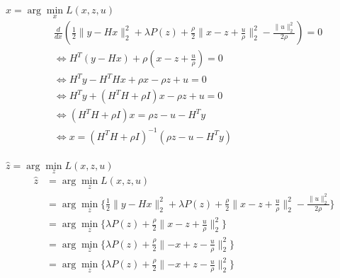 \begin{frame}{$\hat x = \arg\min\limits_{x} {L(x, z, u)}$}
    \begin{align*}
        &\frac{d}{dx} (\frac{1}{2} \lVert y - Hx \rVert_{2}^{2} + \lambda P(z) +
        \frac{\rho}{2} \lVert x-z+\frac{u}{\rho} \rVert_{2}^{2} 
        - \frac{\lVert u \rVert_{2}^{2}}{2\rho}) = 0 \\
        &\iff H^{T} (y - Hx) + \rho (x-z+\frac{u}{\rho}) = 0 \\
        &\iff H^{T}y - H^{T}Hx + \rho x - \rho z+ u = 0 \\
        &\iff H^{T}y + (H^{T}H + \rho I)x - \rho z+ u = 0 \\
        &\iff (H^{T}H + \rho I)x = \rho z - u - H^{T}y \\
        &\iff x = (H^{T}H + \rho I)^{-1} (\rho z - u - H^{T}y) \\
    \end{align*}
\end{frame}

\begin{frame}{$\hat z = \arg\min\limits_{z} {L(x, z, u)}$}
    \begin{align*}
        \hat z
        &= \arg\min\limits_{z} L(x, z, u) \\
        &= \arg\min\limits_{z} \{
            \frac{1}{2} \lVert y - Hx \rVert_{2}^{2} + \lambda P(z) +
            \frac{\rho}{2} \lVert x-z+\frac{u}{\rho} \rVert_{2}^{2} 
            - \frac{\lVert u \rVert_{2}^{2}}{2\rho}
        \} \\
        &= \arg\min\limits_{z} \{
            \lambda P(z) +
            \frac{\rho}{2} \lVert x-z+\frac{u}{\rho} \rVert_{2}^{2} 
        \} \\
        &= \arg\min\limits_{z} \{
            \lambda P(z) +
            \frac{\rho}{2} \lVert -x+z-\frac{u}{\rho} \rVert_{2}^{2} 
        \} \\
        &= \arg\min\limits_{z} \{
            \lambda P(z) +
            \frac{\rho}{2} \lVert -x+z-\frac{u}{\rho} \rVert_{2}^{2} 
        \}
    \end{align*}
\end{frame}

